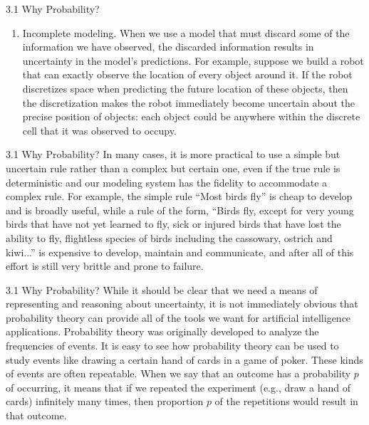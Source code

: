 \begin{frame}{3.1 Why Probability?}
    \begin{enumerate}
        \justifying
        \conti
        \item Incomplete modeling. When we use a model that must discard some of the information we have observed, the discarded information results in uncertainty in the model’s predictions. For example, suppose we build a robot that can exactly observe the location of every object around it. If the robot discretizes space when predicting the future location of these objects, then the discretization makes the robot immediately become uncertain about the precise position of objects: each object could be anywhere within the discrete cell that it was observed to occupy.
        \seti
    \end{enumerate}
\end{frame}

\begin{frame}{3.1 Why Probability?}
    \justifying
    In many cases, it is more practical to use a simple but uncertain rule rather than a complex but certain one, even if the true rule is deterministic and our modeling system has the fidelity to accommodate a complex rule. For example, the simple rule ``Most birds fly'' is cheap to develop and is broadly useful, while a rule of the form, ``Birds fly, except for very young birds that have not yet learned to fly, sick or injured birds that have lost the ability to fly, flightless species of birds including the cassowary, ostrich and kiwi...'' is expensive to develop, maintain and communicate, and after all of this effort is still very brittle and prone to failure.
\end{frame}

\begin{frame}{3.1 Why Probability?}
    \justifying
    While it should be clear that we need a means of representing and reasoning about uncertainty, it is not immediately obvious that probability theory can provide all of the tools we want for artificial intelligence applications. Probability theory was originally developed to analyze the frequencies of events. It is easy to see how probability theory can be used to study events like drawing a certain hand of cards in a game of poker. These kinds of events are often repeatable. When we say that an outcome has a probability $p$ of occurring, it means that if we repeated the experiment (e.g., draw a hand of cards) infinitely many times, then proportion $p$ of the repetitions would result in that outcome. 
\end{frame}

